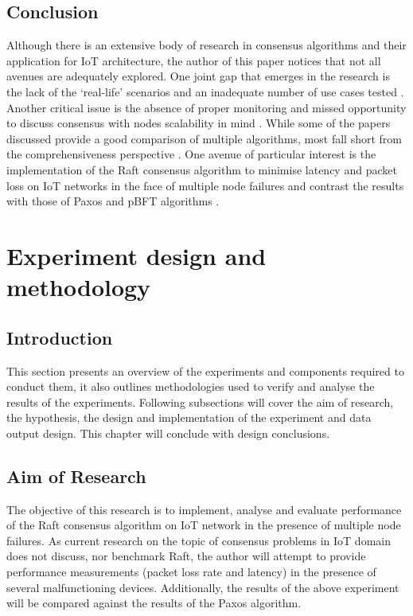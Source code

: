 \documentclass[oneside,12pt]{book}
\begin{document}
\section{Conclusion}
Although there is an extensive body of research in consensus algorithms and their application for IoT architecture, the author of this paper notices that not all avenues are adequately explored. One joint gap that emerges in the research is the lack of the ‘real-life’ scenarios \citep{GULATI2020102222,10.1145/3132211.3134454} and an inadequate number of use cases tested \citep{10.1007/978-3-030-30278-8_34, 8737532, FORTINO202034, MONDAL202041}. Another critical issue is the absence of proper monitoring \citep{Hao2018EdgeConsAE} and missed opportunity to discuss consensus with nodes scalability in mind \citep{6740862, 10.1016/j.jnca.2019.04.017, RAGHAV2020101291}. While some of the papers discussed provide a good comparison of multiple algorithms, most fall short from the comprehensiveness perspective \citep{OROSTICA201915, SALIMITARI2020100212, 7417252}. One avenue of particular interest is the implementation of the Raft consensus algorithm to minimise latency and packet loss on IoT networks in the face of multiple node failures and contrast the results with those of Paxos and pBFT algorithms \citep{whittaker2020matchmaker, GRAMOLI2020760}.


\chapter{Experiment design and methodology}
\section{Introduction}
This section presents an overview of the experiments and components required to conduct them, it also outlines methodologies used to verify and analyse the results of the experiments. Following subsections will cover the aim of research, the hypothesis, the design and implementation of the experiment and data output design. This chapter will conclude with design conclusions.
\section{Aim of Research}
The objective of this research is to implement, analyse and evaluate performance of the Raft consensus algorithm on IoT network in the presence of multiple node failures. As current research on the topic of consensus problems in IoT domain does not discuss, nor benchmark Raft, the author will attempt to provide performance measurements (packet loss rate and latency) in the presence of several malfunctioning devices. Additionally, the results of the above experiment will be compared against the results of the Paxos algorithm.
\end{document}
